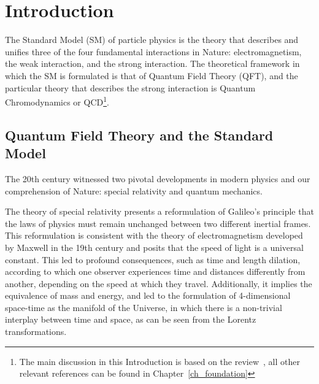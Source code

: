 \chapter*{Introduction}

\label{ch_introduction}



The Standard Model (SM) of particle physics is the theory that describes and unifies three of the four fundamental interactions in Nature: electromagnetism, the weak interaction, and the strong interaction. The theoretical framework in which the SM is formulated is that of Quantum Field Theory (QFT), and the particular theory that describes the strong interaction is Quantum Chromodynamics or QCD\footnote{The main discussion in this Introduction is based on the review~\citep{Wilczek:1998ma}, all other relevant references can be found in Chapter~\ref{ch_foundation}}.

\section*{Quantum Field Theory and the Standard Model}

The 20th century witnessed two pivotal developments in modern physics and our comprehension of Nature: special relativity and quantum mechanics. 

The theory of special relativity presents a reformulation of Galileo's principle that the laws of physics must remain unchanged between two different inertial frames. This reformulation is consistent with the theory of electromagnetism developed by Maxwell in the 19th century and posits that the speed of light is a universal constant. This led to profound consequences, such as time and length dilation, according to which one observer experiences time and distances differently from another, depending on the speed at which they travel. Additionally, it implies the equivalence of mass and energy, and led to the formulation of 4-dimensional space-time as the manifold of the Universe, in which there is a non-trivial interplay between time and space, as can be seen from the Lorentz transformations.

